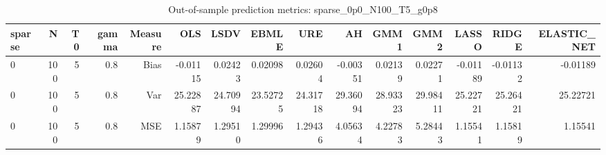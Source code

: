 \begin{table}[!htbp]\centering
\caption{Out-of-sample prediction metrics: sparse_0p0_N100_T5_g0p8}
\label{tab:table3_sparse_0p0_N100_T5_g0p8}
\begin{tabular}{lrrrrrrrrrrrrrr}
\hline
sparse & N & T0 & gamma & Measure & OLS & LSDV & EBMLE & URE & AH & GMM1 & GMM2 & LASSO & RIDGE & ELASTIC_NET \\
\hline
0 & 100 & 5 & 0.8 & Bias & -0.01115 & 0.02423 & 0.02098 & 0.02604 & -0.00351 & 0.02139 & 0.02271 & -0.01189 & -0.01132 & -0.01189 \\
0 & 100 & 5 & 0.8 & Var & 25.22887 & 24.70994 & 23.52725 & 24.31718 & 29.36094 & 28.93323 & 29.98411 & 25.22721 & 25.26421 & 25.22721 \\
0 & 100 & 5 & 0.8 & MSE & 1.15879 & 1.29510 & 1.29996 & 1.29436 & 4.05634 & 4.22783 & 5.28443 & 1.15541 & 1.15819 & 1.15541 \\
\hline
\end{tabular}
\end{table}


